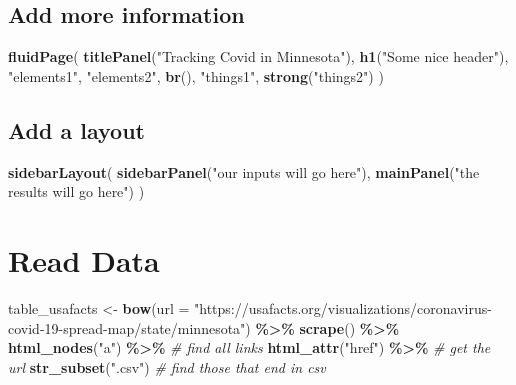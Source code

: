 \documentclass[
]{book}
\newenvironment{Shaded}{\begin{snugshade}}{\end{snugshade}}
\newcommand{\AttributeTok}[1]{\textcolor[rgb]{0.13,0.29,0.53}{#1}}
\newcommand{\CommentTok}[1]{\textcolor[rgb]{0.56,0.35,0.01}{\textit{#1}}}
\newcommand{\FunctionTok}[1]{\textcolor[rgb]{0.13,0.29,0.53}{\textbf{#1}}}
\newcommand{\NormalTok}[1]{#1}
\newcommand{\OtherTok}[1]{\textcolor[rgb]{0.56,0.35,0.01}{#1}}
\newcommand{\SpecialCharTok}[1]{\textcolor[rgb]{0.81,0.36,0.00}{\textbf{#1}}}
\newcommand{\StringTok}[1]{\textcolor[rgb]{0.31,0.60,0.02}{#1}}
\begin{document}
\hypertarget{add-more-information}{%
\subsection{Add more information}\label{add-more-information}}

\begin{Shaded}
\begin{Highlighting}[]
\FunctionTok{fluidPage}\NormalTok{(}
  \FunctionTok{titlePanel}\NormalTok{(}\StringTok{"Tracking Covid in Minnesota"}\NormalTok{),}
  \FunctionTok{h1}\NormalTok{(}\StringTok{"Some nice header"}\NormalTok{),}
  \StringTok{"elements1"}\NormalTok{,}
  \StringTok{"elements2"}\NormalTok{,}
  \FunctionTok{br}\NormalTok{(),}
  \StringTok{"things1"}\NormalTok{,}
  \FunctionTok{strong}\NormalTok{(}\StringTok{"things2"}\NormalTok{)}
\NormalTok{)}
\end{Highlighting}
\end{Shaded}

\hypertarget{add-a-layout}{%
\subsection{Add a layout}\label{add-a-layout}}

\begin{Shaded}
\begin{Highlighting}[]
\FunctionTok{sidebarLayout}\NormalTok{(}
  \FunctionTok{sidebarPanel}\NormalTok{(}\StringTok{"our inputs will go here"}\NormalTok{),}
  \FunctionTok{mainPanel}\NormalTok{(}\StringTok{"the results will go here"}\NormalTok{)}
\NormalTok{)}
\end{Highlighting}
\end{Shaded}

\hypertarget{read-data}{%
\section{Read Data}\label{read-data}}

\begin{Shaded}
\begin{Highlighting}[]
\NormalTok{table\_usafacts }\OtherTok{\textless{}{-}} \FunctionTok{bow}\NormalTok{(}\AttributeTok{url =} \StringTok{"https://usafacts.org/visualizations/coronavirus{-}covid{-}19{-}spread{-}map/state/minnesota"}\NormalTok{) }\SpecialCharTok{\%\textgreater{}\%}
  \FunctionTok{scrape}\NormalTok{() }\SpecialCharTok{\%\textgreater{}\%}  \FunctionTok{html\_nodes}\NormalTok{(}\StringTok{"a"}\NormalTok{) }\SpecialCharTok{\%\textgreater{}\%}       \CommentTok{\# find all links}
  \FunctionTok{html\_attr}\NormalTok{(}\StringTok{"href"}\NormalTok{) }\SpecialCharTok{\%\textgreater{}\%}     \CommentTok{\# get the url}
  \FunctionTok{str\_subset}\NormalTok{(}\StringTok{".csv"}\NormalTok{)        }\CommentTok{\# find those that end in csv}
\end{Highlighting}
\end{Shaded}
\end{document}

